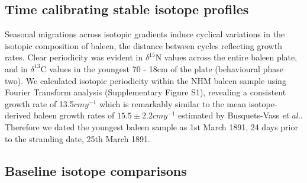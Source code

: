 \documentclass[a4paper,12pt]{article}
\begin{document}
\subsection{Time calibrating stable isotope
profiles}\label{time-calibrating-stable-isotope-profiles}

Seasonal migrations across isotopic gradients induce cyclical variations in the isotopic composition of baleen, the distance between cycles reflecting growth rates\cite{hobson1998stable,busquets2017estimating}. 
Clear periodicity was evident in $\delta^{15}$N values across the entire baleen plate, and in $\delta^{13}$C values in the youngest 70 - 18cm of the plate (behavioural phase two). 
We calculated isotopic periodicity within the NHM baleen sample using Fourier Transform analysis\cite{cardona2017temporal} (Supplementary Figure S1), revealing a consistent growth rate of 13.5$cmy^{-1}$ which is remarkably similar to the mean isotope-derived baleen growth rates of $15.5 \pm 2.2cmy^{-1}$ estimated by Busquets-Vass \textit{et al.}\cite{busquets2017estimating}.  
Therefore we dated the youngest baleen sample as 1st March 1891, 24 days prior to the stranding date, 25th March 1891. 

\subsection{Baseline isotope
comparisons}\label{baseline-isotope-comparisons}
\end{document}
